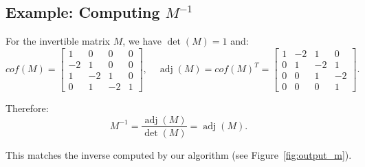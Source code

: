\documentclass{article}
\begin{document}
\subsection*{Example: Computing $M^{-1}$}

For the invertible matrix $M$, we have $\det(M)=1$ and:
\[
cof(M) =
\begin{bmatrix}
1 & 0 & 0 & 0 \\
-2 & 1 & 0 & 0 \\
1 & -2 & 1 & 0 \\
0 & 1 & -2 & 1
\end{bmatrix},\quad
\operatorname{adj}(M) = cof(M)^T =
\begin{bmatrix}
1 & -2 & 1 & 0 \\
0 & 1 & -2 & 1 \\
0 & 0 & 1 & -2 \\
0 & 0 & 0 & 1
\end{bmatrix}.
\]

Therefore:
\[
M^{-1} = \frac{\operatorname{adj}(M)}{\det(M)} = \operatorname{adj}(M).
\]

This matches the inverse computed by our algorithm (see Figure~\ref{fig:output_m}).
\end{document}
